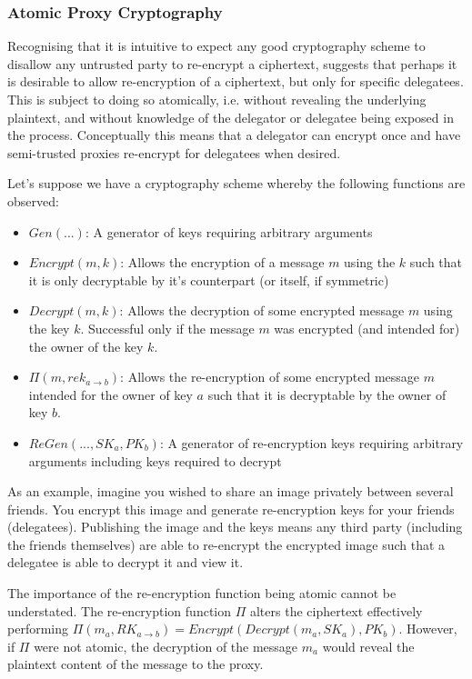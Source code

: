 \subsubsection{Atomic Proxy Cryptography}

Recognising that it is intuitive to expect any good cryptography scheme to disallow any untrusted party to re-encrypt a ciphertext, \cite{bbs:1998:book} suggests that perhaps it is desirable to allow re-encryption of a ciphertext, but only for specific delegatees. This is subject to doing so atomically, i.e. without revealing the underlying plaintext, and without knowledge of the delegator or delegatee being exposed in the process. Conceptually this means that a delegator can encrypt once and have semi-trusted proxies re-encrypt for delegatees when desired.

Let's suppose we have a cryptography scheme whereby the following functions are observed:

\begin{itemize}
  \item $Gen(...)$: A generator of keys requiring arbitrary arguments
  \item $Encrypt(m, k)$: Allows the encryption of a message $m$ using the $k$ such that it is only decryptable by it's counterpart (or itself, if symmetric)
  \item $Decrypt(m, k)$: Allows the decryption of some encrypted message $m$ using the key $k$. Successful only if the message $m$ was encrypted (and intended for) the owner of the key $k$.
  \item $\Pi(m, rek_{a \rightarrow b})$: Allows the re-encryption of some encrypted message $m$ intended for the owner of key $a$ such that it is decryptable by the owner of key $b$.
  \item $ReGen(..., SK_a, PK_b)$: A generator of re-encryption keys requiring arbitrary arguments including keys required to decrypt
\end{itemize}

As an example, imagine you wished to share an image privately between several friends. You encrypt this image and generate re-encryption keys for your friends (delegatees). Publishing the image and the keys means any third party (including the friends themselves) are able to re-encrypt the encrypted image such that a delegatee is able to decrypt it and view it.

The importance of the re-encryption function being atomic cannot be understated. The re-encryption function $\Pi$ alters the ciphertext effectively performing $\Pi(m_a, RK_{a \rightarrow b}) = Encrypt(Decrypt(m_a, SK_a), PK_b)$. However, if $\Pi$ were not atomic, the decryption of the message $m_a$ would reveal the plaintext content of the message to the proxy.

